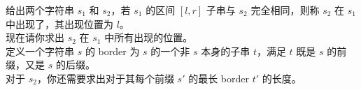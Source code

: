 给出两个字符串 $s_1$ 和 $s_2$，若 $s_1$ 的区间 $[l, r]$ 子串与 $s_2$ 完全相同，则称 $s_2$ 在 $s_1$ 中出现了，其出现位置为 $l$。\\
现在请你求出 $s_2$ 在 $s_1$ 中所有出现的位置。\\
定义一个字符串 $s$ 的 border 为 $s$ 的一个非 $s$ 本身的子串 $t$，满足 $t$ 既是 $s$ 的前缀，又是 $s$ 的后缀。\\
对于 $s_2$，你还需要求出对于其每个前缀 $s'$ 的最长 border $t'$ 的长度。